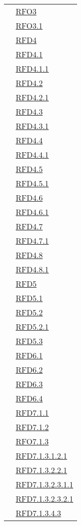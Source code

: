 \begin{longtable}{|>{\centering}m{5cm}|m{5cm}<{\centering}|}
& \hyperlink{RFO3}{RFO3}\\
& \hyperlink{RFO3.1}{RFO3.1}\\
& \hyperlink{RFD4}{RFD4}\\
& \hyperlink{RFD4.1}{RFD4.1}\\
& \hyperlink{RFD4.1.1}{RFD4.1.1}\\
& \hyperlink{RFD4.2}{RFD4.2}\\
& \hyperlink{RFD4.2.1}{RFD4.2.1}\\
& \hyperlink{RFD4.3}{RFD4.3}\\
& \hyperlink{RFD4.3.1}{RFD4.3.1}\\
& \hyperlink{RFD4.4}{RFD4.4}\\
& \hyperlink{RFD4.4.1}{RFD4.4.1}\\
& \hyperlink{RFD4.5}{RFD4.5}\\
& \hyperlink{RFD4.5.1}{RFD4.5.1}\\
& \hyperlink{RFD4.6}{RFD4.6}\\
& \hyperlink{RFD4.6.1}{RFD4.6.1}\\
& \hyperlink{RFD4.7}{RFD4.7}\\
& \hyperlink{RFD4.7.1}{RFD4.7.1}\\
& \hyperlink{RFD4.8}{RFD4.8}\\
& \hyperlink{RFD4.8.1}{RFD4.8.1}\\
& \hyperlink{RFD5}{RFD5}\\
& \hyperlink{RFD5.1}{RFD5.1}\\
& \hyperlink{RFD5.2}{RFD5.2}\\
& \hyperlink{RFD5.2.1}{RFD5.2.1}\\
& \hyperlink{RFD5.3}{RFD5.3}\\
& \hyperlink{RFD6.1}{RFD6.1}\\
& \hyperlink{RFD6.2}{RFD6.2}\\
& \hyperlink{RFD6.3}{RFD6.3}\\
& \hyperlink{RFD6.4}{RFD6.4}\\
& \hyperlink{RFD7.1.1}{RFD7.1.1}\\
& \hyperlink{RFD7.1.2}{RFD7.1.2}\\
& \hyperlink{RFO7.1.3}{RFO7.1.3}\\
& \hyperlink{RFD7.1.3.1.2.1}{RFD7.1.3.1.2.1}\\
& \hyperlink{RFD7.1.3.2.2.1}{RFD7.1.3.2.2.1}\\
& \hyperlink{RFD7.1.3.2.3.1.1}{RFD7.1.3.2.3.1.1}\\
& \hyperlink{RFD7.1.3.2.3.2.1}{RFD7.1.3.2.3.2.1}\\
& \hyperlink{RFD7.1.3.4.3}{RFD7.1.3.4.3}\\

\end{longtable}

